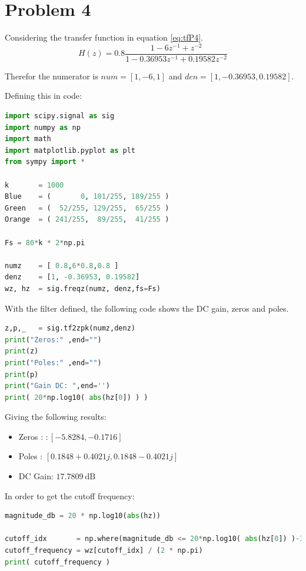 \section{Problem 4}

Considering the transfer function in equation \ref{eq:tfP4}.
\begin{equation}
    \label{eq:tfP4}
    H(z)=0.8\frac{1 - 6z^{-1} + z^{-2}}{1 - 0.36953z^{-1} + 0.19582z^{-2}}
\end{equation}

Therefor the numerator is $num = [1, -6, 1]$ and $den = [1, -0.36953, 0.19582]$.

Defining this in code:

\begin{lstlisting}[language=python, caption = Specification Definition]
import scipy.signal as sig
import numpy as np
import math
import matplotlib.pyplot as plt 
from sympy import *

k       = 1000
Blue    = (       0, 101/255, 189/255 )
Green   = (  52/255, 129/255,  65/255 )
Orange  = ( 241/255,  89/255,  41/255 )

Fs = 80*k * 2*np.pi

numz    = [ 0.8,6*0.8,0.8 ]
denz    = [1, -0.36953, 0.19582]
wz, hz  = sig.freqz(numz, denz,fs=Fs)
\end{lstlisting}

With the filter defined, the following code shows the DC gain, zeros and poles.

\begin{lstlisting}[language=python, caption = Specification Definition]
z,p,_   = sig.tf2zpk(numz,denz)
print("Zeros:" ,end="")
print(z)
print("Poles:" ,end="")
print(p)
print("Gain DC: ",end='')
print( 20*np.log10( abs(hz[0]) ) )
\end{lstlisting}

Giving the following results:
\begin{itemize}
    \item Zeros : $:[-5.8284, -0.1716]$
    \item Poles : $[0.1848+0.4021j, 0.1848-0.4021j]$
    \item DC Gain: $17.7809~\si{\dB}$
\end{itemize}

In order to get the cutoff frequency:

\begin{lstlisting}[language=python, caption = Specification Definition]
magnitude_db = 20 * np.log10(abs(hz))

cutoff_idx       = np.where(magnitude_db <= 20*np.log10( abs(hz[0]) )-3.01)[0][0]
cutoff_frequency = wz[cutoff_idx] / (2 * np.pi) 
print( cutoff_frequency )
\end{lstlisting}

